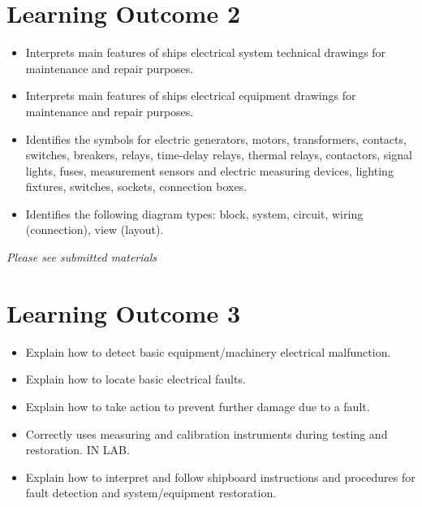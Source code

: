\documentclass[11pt,a4paper]{article}
\begin{document}
\section{Learning Outcome 2}
\begin{tcolorbox}[colback=red!5!white,colframe=red!75!black,title=\textbf{Demonstrate knowledge of and interpret basic electrical drawings.
PERFORMED USING VISIO SOFTWARE AND IN CLASS ANALYSIS. No answers required here. Student to submit Visio drawing file.}]
\begin{itemize}
\item Interprets main features of ships electrical system technical drawings for maintenance and repair purposes.
\item Interprets main features of ships electrical equipment drawings for maintenance and repair purposes.
\item Identifies the symbols for electric generators, motors, transformers, contacts, switches, breakers, relays, time-delay relays, thermal relays, contactors, signal lights, fuses, measurement sensors and electric measuring devices, lighting fixtures, switches, sockets, connection boxes.
\item Identifies the following diagram types: block, system, circuit, wiring (connection), view (layout).
\end{itemize}
\end{tcolorbox}
\textit{Please see submitted materials}


\newpage
\section{Learning Outcome 3}
\begin{tcolorbox}[colback=red!5!white,colframe=red!75!black,title=\textbf{Test for and detect basic faults and restore electrical equipment and machinery to operating condition}]
\begin{itemize}
\item Explain how to detect basic equipment/machinery electrical malfunction.
\item Explain how to locate basic electrical faults.
\item Explain how to take action to prevent further damage due to a fault.
\item Correctly uses measuring and calibration instruments during testing and restoration. IN LAB.
\item Explain how to interpret and follow shipboard instructions and procedures for fault detection and system/equipment restoration.
\end{itemize}
\end{tcolorbox}
\end{document}
